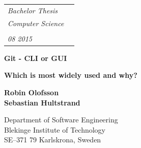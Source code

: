 \documentclass[a4paper,oneside]{bth} %
\begin{document}
		\pagestyle{plain}
		
		{\pagestyle{empty}
		\changepage{5cm}{1cm}{-0.5cm}{-0.5cm}{}{-2cm}{}{}{}
		\noindent%
			{\small
				\begin{tabular}{p{} p{}}
					\textit{Bachelor Thesis}&\multirow{4}{*}{\bthcsnotextlogo{3cm}}
					\\
					\textit{Computer Science}
					\\
					\\
					\textit{08 2015}
					\\
				\end{tabular}
			}
			\begin{center}
				\par\vspace {7cm}
				{\Huge\textbf{Git - CLI or GUI}}   
				\par\vspace {0.5cm}
				{\Large\textbf{Which is most widely used and why?}}                   
				\par\vspace {3cm}
				{\Large\textbf{Robin Olofsson}}
				\\
				{\Large\textbf{Sebastian Hultstrand}}
				\par\vspace {7cm}
			\end{center}

			\noindent%
			{\small Department of Software Engineering 
			\\
			Blekinge Institute of Technology
			\\
			SE--371 79 Karlskrona, Sweden}
			\clearpage
		}
\end{document}
